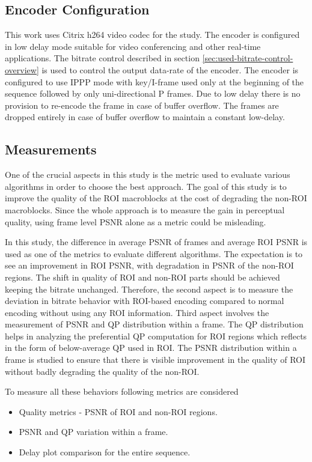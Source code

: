 \documentclass[11pt]{article} %
\begin{document}
\subsection{Encoder Configuration}      
This work uses Citrix h264 video codec for the study. The encoder is configured in low delay mode suitable for video conferencing and other real-time applications. The bitrate control described in section \ref{sec:used-bitrate-control-overview} is used to control the output data-rate of the encoder. The encoder is configured to use IPPP mode with key/I-frame used only at the beginning of the sequence followed by only uni-directional P frames. Due to low delay there is no provision to re-encode the frame in case of buffer overflow. The frames are dropped entirely in case of buffer overflow to maintain a constant low-delay.

\subsection{Measurements}
One of the crucial aspects in this study is the metric used to evaluate various algorithms in order to choose the best approach. The goal of this study is to improve the quality of the ROI macroblocks at the cost of degrading the non-ROI macroblocks. Since the whole approach is to measure the gain in perceptual quality, using frame level PSNR alone as a metric could be misleading. 

In this study, the difference in average PSNR of frames and average ROI PSNR is used as one of the metrics to evaluate different algorithms. The expectation is to see an improvement in ROI PSNR, with degradation in PSNR of the non-ROI regions. The shift in quality of ROI and non-ROI parts should be achieved keeping the bitrate unchanged. Therefore, the second aspect is to measure the deviation in bitrate behavior with ROI-based encoding compared to normal encoding without using any ROI information. Third aspect involves the measurement of PSNR and QP distribution within a frame. The QP distribution helps in analyzing the preferential QP computation for ROI regions which reflects in the form of below-average QP used in ROI. The PSNR distribution within a frame is studied to ensure that there is visible improvement in the quality of ROI without badly degrading the quality of the non-ROI. 

To measure all these behaviors following metrics are considered
\begin{itemize}  
\item Quality metrics - PSNR of ROI and non-ROI regions.
\item PSNR and QP variation within a frame.
\item Delay plot comparison for the entire sequence.
\end{itemize}
\end{document}
